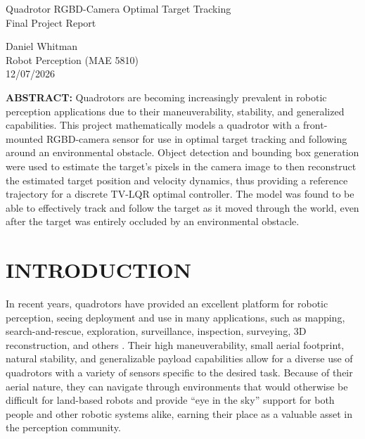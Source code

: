 \documentclass[11pt]{article}
\newcommand{\mainmatter}{\clearpage\setcounter{page}{1}\pagenumbering{arabic}}
\begin{document}
\begin{titlepage}
\begin{center}
    \vspace*{\fill}
    {\Huge Quadrotor RGBD-Camera Optimal Target Tracking}\\
    {\large Final Project Report}

    \vspace{4\baselineskip}
    Daniel Whitman\\
    Robot Perception (MAE 5810)\\
    12/07/2026
\end{center}

\vspace{4\baselineskip}
\noindent \textbf{ABSTRACT:}
\noindent Quadrotors are becoming increasingly prevalent in robotic perception applications due to their maneuverability, stability, and generalized capabilities. This project mathematically models a quadrotor with a front-mounted RGBD-camera sensor for use in optimal target tracking and following around an environmental obstacle. Object detection and bounding box generation were used to estimate the target's pixels in the camera image to then reconstruct the estimated target position and velocity dynamics, thus providing a reference trajectory for a discrete TV-LQR optimal controller. The model was found to be able to effectively track and follow the target as it moved through the world, even after the target was entirely occluded by an environmental obstacle.

\vspace*{\fill}
\end{titlepage}


\mainmatter
\section{INTRODUCTION}\label{sec:intro}
In recent years, quadrotors have provided an excellent platform for robotic perception, seeing deployment and use in many applications, such as mapping, search-and-rescue, exploration, surveillance, inspection, surveying, 3D reconstruction, and others \cite{Michael2012Cmoae,Ribeiro2020UAVL,Sun2024SFaLU,Zhang2022ANIAE,Zhong2022IDFMA}. Their high maneuverability, small aerial footprint, natural stability, and generalizable payload capabilities allow for a diverse use of quadrotors with a variety of sensors specific to the desired task. Because of their aerial nature, they can navigate through environments that would otherwise be difficult for land-based robots and provide ``eye in the sky'' support for both people and other robotic systems alike, earning their place as a valuable asset in the perception community.
\end{document}
